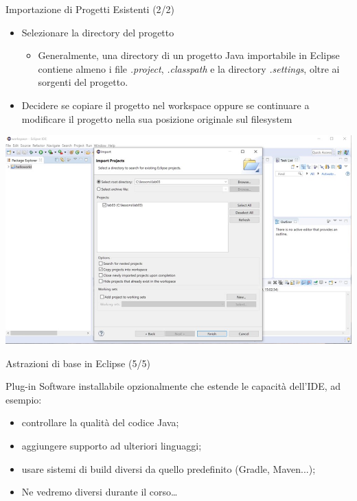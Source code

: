 \documentclass[presentation]{beamer}
\begin{document}
\begin{frame}{Importazione di Progetti Esistenti (2/2)}
\begin{itemize}
\item Selezionare la directory del progetto
\begin{itemize}
\item Generalmente, una directory di un progetto Java importabile in Eclipse contiene almeno i file \emph{.project}, \emph{.classpath} e la directory \emph{.settings}, oltre ai sorgenti del progetto.
\end{itemize}
\item Decidere se copiare il progetto nel workspace oppure se continuare a modificare il progetto nella sua posizione originale sul filesystem
\end{itemize}
\begin{center}
\includegraphics[width=\textwidth]{img/eclipse-screenshots/eclipse-ide-06b.jpg}
\end{center}
\end{frame}

\begin{frame}{Astrazioni di base in Eclipse (5/5)}
\begin{block}{Plug-in}
Software installabile opzionalmente che estende le capacità dell'IDE, ad esempio:
\begin{itemize}
\item controllare la qualità del codice Java;
\item aggiungere supporto ad ulteriori linguaggi;
\item usare sistemi di build diversi da quello predefinito (Gradle, Maven...);
\end{itemize}
\end{block}

\begin{itemize}
\item Ne vedremo diversi durante il corso\dots
\end{itemize}
\end{frame}
\end{document}
